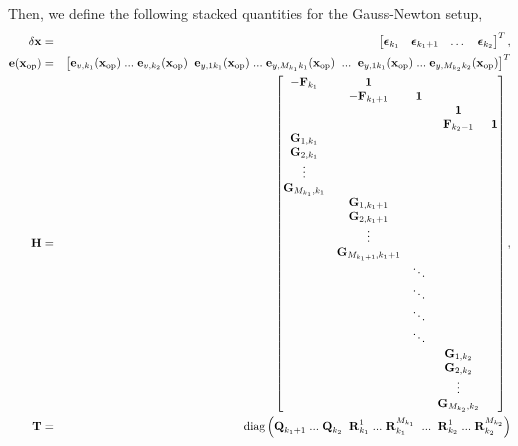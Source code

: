 \documentclass[a4paper]{article}
\begin{document}
Then, we define the following stacked quantities for the Gauss-Newton setup,
\begin{eqnarray}
    \delta \bm{\mathbf{x}} &=& \begin{bmatrix}
      \bm{\mathbf{\epsilon}}_{k_1} & \bm{\mathbf{\epsilon}}_{k_1+1} & \dots & \bm{\mathbf{\epsilon}}_{k_2} 
    \end{bmatrix}^T, \\
    \bm{\mathbf{e}}(\bm{\mathbf{x}}_{\text{op}}) &=& \begin{bmatrix}
      \bm{\mathbf{e}}_{v,k_1}(\bm{\mathbf{x}}_{\text{op}})\; ...\;\bm{\mathbf{e}}_{v, k_2}(\bm{\mathbf{x}}_{\text{op}}) \;\;
      \bm{\mathbf{e}}_{y,1 k_1}(\bm{\mathbf{x}}_{\text{op}})\;...\;\bm{\mathbf{e}}_{y,M_{k_1} k_1}(\bm{\mathbf{x}}_{\text{op}}) \;\; ... \;\; \bm{\mathbf{e}}_{y,1 k_1}(\bm{\mathbf{x}}_{\text{op}})\;...\;\bm{\mathbf{e}}_{y,M_{k_2} k_2}(\bm{\mathbf{x}}_{\text{op}})
    \end{bmatrix}^T\\
    \bm{\mathbf{H}} &=& \begin{bmatrix}
      -\bm{\mathbf{F}}_{k_1} & \bm{\mathbf{1}}          & &&\\
                     & -\bm{\mathbf{F}}_{k_1+1} & \bm{\mathbf{1}} \\
      &&& \bm{\mathbf{1}} & \\
      &&& \bm{\mathbf{F}}_{k_2-1} & \bm{\mathbf{1}}\\
      \bm{\mathbf{G}}_{1,k_1}\\
      \bm{\mathbf{G}}_{2,k_1}\\
      \vdots\\
      \bm{\mathbf{G}}_{M_{k_1},k_1}\\
      &\bm{\mathbf{G}}_{1,k_1+1}\\
      &\bm{\mathbf{G}}_{2,k_1+1}\\
      &\vdots\\
      &\bm{\mathbf{G}}_{M_{k_1+1},k_1+1}\\
      &&\ddots\\
      &&\ddots\\
      &&\ddots\\
      &&\ddots\\
      &&&\bm{\mathbf{G}}_{1,k_2}\\
      &&&\bm{\mathbf{G}}_{2,k_2}\\
      &&&\vdots\\
      &&&\bm{\mathbf{G}}_{M_{k_2},k_2}
    \end{bmatrix},\\
    \bm{\mathbf{T}} &=& \text{diag} \left(
      \bm{\mathbf{Q}}_{k_1+1}\; ...\; \bm{\mathbf{Q}}_{k_2} \;\; {\bm{\mathbf{R}}_{k_1}^{1}}\;...\;{\bm{\mathbf{R}}_{k_1}^{M_{k_1}}}\;\;...\;\;{\bm{\mathbf{R}}_{k_2}^{1}}\;...\;{\bm{\mathbf{R}}_{k_2}^{M_{k_2}}} \right)
\end{eqnarray}
\end{document}
